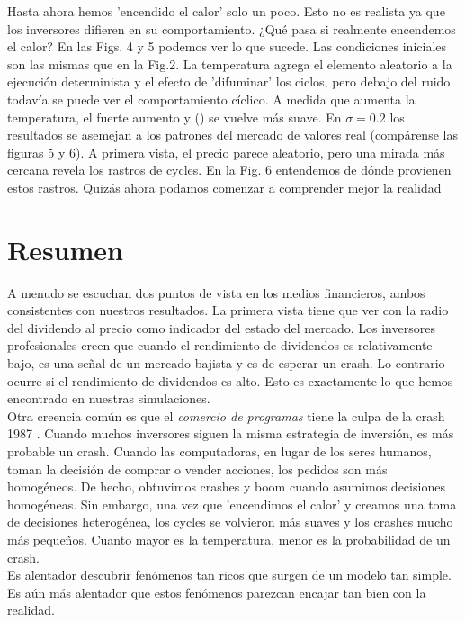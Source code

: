 \documentclass[12pt,a4paper]{article}
\begin{document}
\quad Hasta ahora hemos 'encendido el calor' solo un poco. Esto no es realista ya que los inversores difieren en su comportamiento. ¿Qué pasa si realmente encendemos el calor? En las Figs. 4 y 5 podemos ver lo que sucede. Las condiciones iniciales son las mismas que en la Fig.2. La temperatura agrega el elemento aleatorio a la ejecución determinista y el efecto de 'difuminar' los ciclos, pero debajo del ruido todavía se puede ver el comportamiento cíclico. A medida que aumenta la temperatura, el fuerte aumento y () se vuelve más suave. En $\sigma = 0.2$ los resultados se asemejan a los patrones del mercado de valores real (compárense las figuras 5 y 6). A primera vista, el precio parece aleatorio, pero una mirada más cercana revela los rastros de cycles. En la Fig. 6 entendemos de dónde provienen estos rastros. Quizás ahora podamos comenzar a comprender mejor la realidad
\section*{Resumen}
\quad A menudo se escuchan dos puntos de vista en los medios financieros, ambos consistentes con nuestros resultados. La primera vista tiene que ver con la radio del dividendo al precio como indicador del estado del mercado. Los inversores profesionales creen que cuando el rendimiento de dividendos es relativamente bajo, es una señal de un mercado bajista y es de esperar un crash. Lo contrario ocurre si el rendimiento de dividendos es alto. Esto es exactamente lo que hemos encontrado en nuestras simulaciones.\\
\quad Otra creencia común es que el \textit{comercio de programas} tiene la culpa de la crash 1987 . Cuando muchos inversores siguen la misma estrategia de inversión, es más probable un crash. Cuando las computadoras, en lugar de los seres humanos, toman la decisión de comprar o vender acciones, los pedidos son más homogéneos. De hecho, obtuvimos crashes y boom cuando asumimos decisiones homogéneas. Sin embargo, una vez que 'encendimos el calor' y creamos una toma de decisiones heterogénea, los cycles se volvieron más suaves y los crashes mucho más pequeños. Cuanto mayor es la temperatura, menor es la probabilidad de un crash. \\
\quad Es alentador descubrir fenómenos tan ricos que surgen de un modelo tan simple. Es aún más alentador que estos fenómenos parezcan encajar tan bien con la realidad.

\newpage
\begin{center}
\citep{Samanidou2007}
\end{center}
\end{document}

